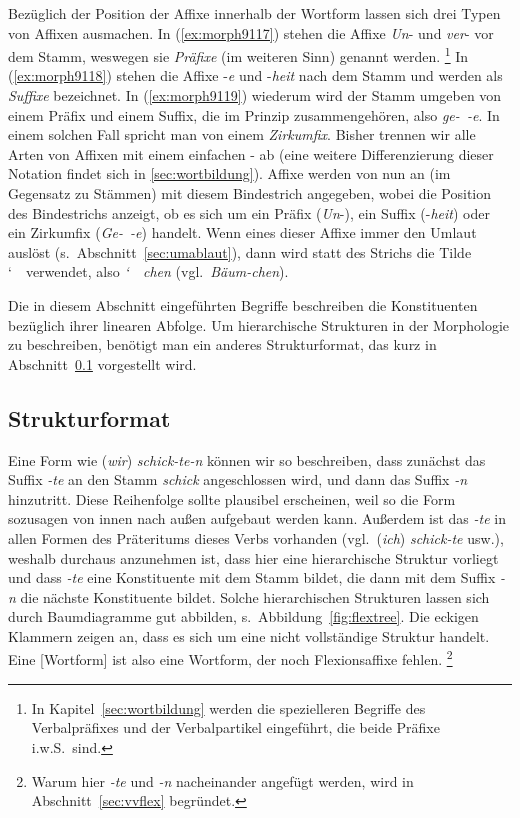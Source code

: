 Bezüglich der Position der Affixe innerhalb der Wortform lassen sich drei Typen von Affixen ausmachen.
In (\ref{ex:morph9117}) stehen die Affixe \textit{Un}- und \textit{ver}- vor dem Stamm, weswegen sie \textit{Präfixe} (im weiteren Sinn) genannt werden.%
\footnote{In Kapitel~\ref{sec:wortbildung} werden die spezielleren Begriffe des Verbalpräfixes und der Verbalpartikel eingeführt, die beide Präfixe i.w.S.\ sind.}
In (\ref{ex:morph9118}) stehen die Affixe -\textit{e} und -\textit{heit} nach dem Stamm und werden als \textit{Suffixe} bezeichnet.
In (\ref{ex:morph9119}) wiederum wird der Stamm umgeben von einem Präfix und einem Suffix, die im Prinzip zusammengehören, also \textit{ge-~-e}.
In einem solchen Fall spricht man von einem \textit{Zirkumfix}.
Bisher trennen wir alle Arten von Affixen mit einem einfachen - ab (eine weitere Differenzierung dieser Notation findet sich in \ref{sec:wortbildung}).
Affixe werden von nun an (im Gegensatz zu Stämmen) mit diesem Bindestrich angegeben, wobei die Position des Bindestrichs anzeigt, ob es sich um ein Präfix (\textit{Un}-), ein Suffix (-\textit{heit}) oder ein Zirkumfix (\textit{Ge-~-e}) handelt.
Wenn eines dieser Affixe immer den Umlaut auslöst (s.\ Abschnitt~\ref{sec:umablaut}), dann wird statt des Strichs die Tilde \char`~\ verwendet, also \zB \mbox{\textit{\char`~ chen}} (vgl.\ \textit{Bäum-chen}).

Die in diesem Abschnitt eingeführten Begriffe beschreiben die Konstituenten bezüglich ihrer linearen Abfolge.
Um hierarchische Strukturen in der Morphologie zu beschreiben, benötigt man ein anderes Strukturformat, das kurz in Abschnitt~\ref{sec:morphstrukform} vorgestellt wird.

\subsection{Strukturformat}

\label{sec:morphstrukform}

Eine Form wie (\textit{wir}) \textit{schick-te-n} können wir so beschreiben, dass zunächst das Suffix \textit{-te} an den Stamm \textit{schick} angeschlossen wird, und dann das Suffix \textit{-n} hinzutritt.
Diese Reihenfolge sollte plausibel erscheinen, weil so die Form sozusagen von innen nach außen aufgebaut werden kann.
Außerdem ist das \textit{-te} in allen Formen des Präteritums dieses Verbs vorhanden (vgl.\ (\textit{ich}) \textit{schick-te} usw.), weshalb durchaus anzunehmen ist, dass hier eine hierarchische Struktur vorliegt und dass \textit{-te} eine Konstituente mit dem Stamm bildet, die dann mit dem Suffix \textit{-n} die nächste Konstituente bildet.
Solche hierarchischen Strukturen lassen sich durch Baumdiagramme gut abbilden, s.\ Abbildung~\ref{fig:flextree}.
Die eckigen Klammern zeigen an, dass es sich um eine nicht vollständige Struktur handelt.
Eine [Wortform] ist also eine Wortform, der noch Flexionsaffixe fehlen.%
\footnote{Warum hier \textit{-te} und \textit{-n} nacheinander angefügt werden, wird in Abschnitt~\ref{sec:vvflex} begründet.}


